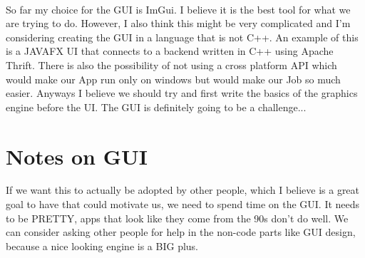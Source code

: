 \documentclass{article}
\begin{document}
	\paragraph{}
	So far my choice for the GUI is ImGui. I believe it is the best tool for what we are trying to do. However, I also think this might be very complicated and I'm considering creating the GUI in a language that is not C++. An example of this is a JAVAFX UI that connects to a backend written in C++ using Apache Thrift. There is also the possibility of not using a cross platform API which would make our App run only on windows but would make our Job so much easier. Anyways I believe we should try and first write the basics of the graphics engine before the UI. The GUI is definitely going to be a challenge...
	

	
	
	
	\section{Notes on GUI}
	If we want this to actually be adopted by other people, which I believe is a great goal to have that could motivate us, we need to spend time on the GUI. It needs to be PRETTY, apps that look like they come from the 90s don't do well. We can consider asking other people for help in the non-code parts like GUI design, because a nice looking engine is a BIG plus.
	
	
	
	
	
	
\end{document}
